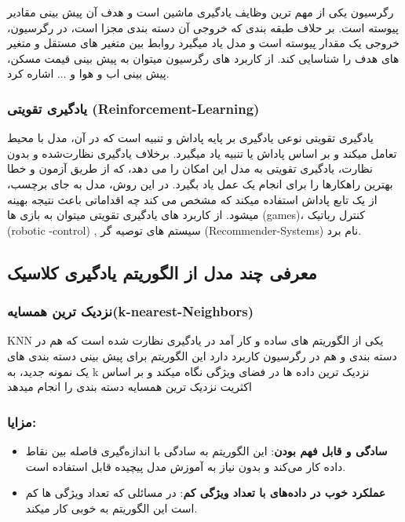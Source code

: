 رگرسیون یکی از مهم ترین وظایف یادگیری ماشین است و هدف آن پیش بینی مقادیر پیوسته است.
بر حلاف طبقه بندی که خروجی آن دسته بندی مجزا است، در رگرسیون، خروجی یک مقدار پیوسته است و مدل یاد میگیرد روابط بین متغیر های مستقل و متغیر های هدف را شناسایی کند.
از کاربرد های رگرسیون میتوان به پیش بینی قیمت مسکن، پیش بینی اب و هوا و ... اشاره کرد.
 \subsubsection{یادگیری تقویتی (Reinforcement-Learning)}
 
یادگیری تقویتی نوعی یادگیری بر پایه پاداش و تنبیه است که در آن، مدل با محیط تعامل میکند و بر اساس پاداش یا تنبیه یاد میگیرد.
برخلاف یادگیری نظارت‌شده و بدون نظارت، یادگیری تقویتی به مدل این امکان را می دهد، که از طریق آزمون و خطا بهترین راهکارها را برای انجام یک عمل یاد بگیرد.
در این روش، مدل به جای برچسب، از یک تابع پاداش استفاده میکند که مشخص می کند چه اقداماتی باعث نتیجه بهینه میشود. از کاربرد های یادگیری تقویتی میتوان به بازی ها (games)، کنترل رباتیک (robotic -control) , سیستم های توصیه گر (Recommender-Systems) نام برد.


\subsection{معرفی چند مدل از الگوریتم یادگیری کلاسیک }

\subsubsection{نزدیک ترین همسایه(k-nearest-Neighbors)}

KNN  یکی از الگوریتم های ساده  و کار آمد در یادگیری نظارت شده است  که هم در دسته بندی و هم در رگرسیون کاربرد دارد این الگوریتم برای پیش بینی دسته بندی های یک نمونه جدید، به k نزدیک ترین داده ها در فضای ویژگی نگاه میکند و بر اساس اکثریت نزدیک ترین همسایه دسته بندی را انجام میدهد
\subsubsection{مزایا:}

\begin{itemize}
	
	    \item \textbf{سادگی و قابل فهم بودن}: این الگوریتم به سادگی با اندازه‌گیری فاصله بین نقاط داده کار می‌کند و بدون نیاز به آموزش مدل پیچیده قابل استفاده است.
	\item \textbf{عملکرد خوب در داده‌های با تعداد ویژگی کم}:
	در مسائلی که تعداد ویژگی ها کم است این الگوریتم به خوبی کار میکند.
	\end{itemize}

